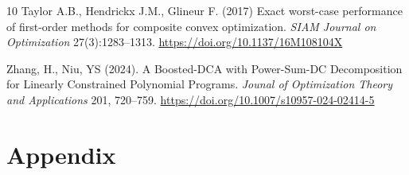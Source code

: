 \documentclass{article} %
\begin{document}
\begin{thebibliography}{10}
 Taylor A.B., Hendrickx J.M., Glineur F. (2017) Exact worst-case performance of first-order methods
for composite convex optimization. \textit{SIAM Journal on Optimization} 27(3):1283--1313. \url{https://doi.org/10.1137/16M108104X}
	




Zhang, H., Niu, YS  (2024). A Boosted-DCA with Power-Sum-DC Decomposition for Linearly Constrained Polynomial Programs. \textit{Jounal of Optimization Theory and Applications} 201, 720–759. \url{https://doi.org/10.1007/s10957-024-02414-5}

\end{thebibliography}

\section*{Appendix}
\end{document}
